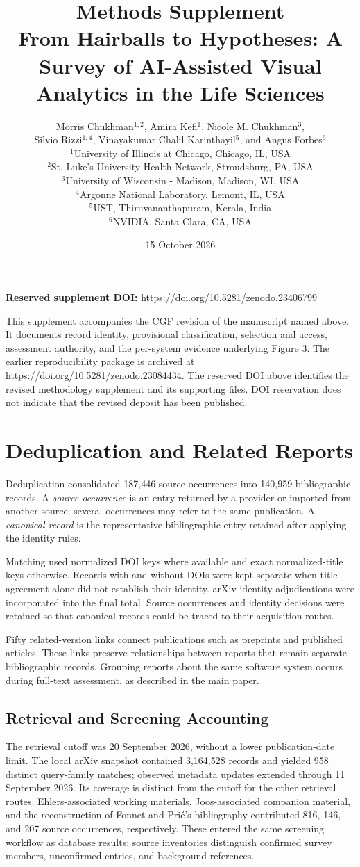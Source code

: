 \documentclass[11pt]{article}
\title{Methods Supplement\\\large From Hairballs to Hypotheses: A Survey of AI-Assisted Visual Analytics in the Life Sciences}
\author{\small Morris Chukhman$^{1,2}$, Amira Kefi$^1$, Nicole M. Chukhman$^3$,\\
\small Silvio Rizzi$^{1,4}$, Vinayakumar Chalil Karinthayil$^5$, and Angus Forbes$^6$\\[1ex]
\footnotesize $^1$University of Illinois at Chicago, Chicago, IL, USA\\
\footnotesize $^2$St. Luke's University Health Network, Stroudsburg, PA, USA\\
\footnotesize $^3$University of Wisconsin - Madison, Madison, WI, USA\\
\footnotesize $^4$Argonne National Laboratory, Lemont, IL, USA\\
\footnotesize $^5$UST, Thiruvananthapuram, Kerala, India\\
\footnotesize $^6$NVIDIA, Santa Clara, CA, USA}
\date{15 October 2026}
\begin{document}
\maketitle
\noindent\textbf{Reserved supplement DOI:} \url{https://doi.org/10.5281/zenodo.23406799}
\medskip

\noindent This supplement accompanies the CGF revision of the manuscript named above. It documents record identity, provisional classification, selection and access, assessment authority, and the per-system evidence underlying Figure 3. The earlier reproducibility package is archived at \url{https://doi.org/10.5281/zenodo.23084434}. The reserved DOI above identifies the revised methodology supplement and its supporting files. DOI reservation does not indicate that the revised deposit has been published.

\section{Deduplication and Related Reports}
Deduplication consolidated 187,446 source occurrences into 140,959 bibliographic records. A \emph{source occurrence} is an entry returned by a provider or imported from another source; several occurrences may refer to the same publication. A \emph{canonical record} is the representative bibliographic entry retained after applying the identity rules.

Matching used normalized DOI keys where available and exact normalized-title keys otherwise. Records with and without DOIs were kept separate when title agreement alone did not establish their identity. arXiv identity adjudications were incorporated into the final total. Source occurrences and identity decisions were retained so that canonical records could be traced to their acquisition routes.

Fifty related-version links connect publications such as preprints and published articles. These links preserve relationships between reports that remain separate bibliographic records. Grouping reports about the same software system occurs during full-text assessment, as described in the main paper.


\subsection{Retrieval and Screening Accounting}
The retrieval cutoff was 20 September 2026, without a lower publication-date limit. The local arXiv snapshot contained 3,164,528 records and yielded 958 distinct query-family matches; observed metadata updates extended through 11 September 2026. Its coverage is distinct from the cutoff for the other retrieval routes. Ehlers-associated working materials, Joos-associated companion material, and the reconstruction of Fonnet and Pri\'e's bibliography contributed 816, 146, and 207 source occurrences, respectively. These entered the same screening workflow as database results; source inventories distinguish confirmed survey members, unconfirmed entries, and background references.
\end{document}
